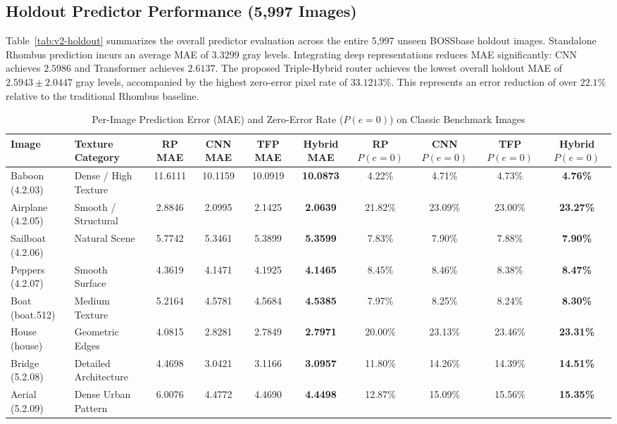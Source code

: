 \documentclass[conference]{IEEEtran}
\begin{document}
\subsection{Holdout Predictor Performance (5,997 Images)}
Table~\ref{tab:v2-holdout} summarizes the overall predictor evaluation across the entire 5,997 unseen BOSSbase holdout images. Standalone Rhombus prediction incurs an average MAE of $3.3299$ gray levels. Integrating deep representations reduces MAE significantly: CNN achieves $2.5986$ and Transformer achieves $2.6137$. The proposed Triple-Hybrid router achieves the lowest overall holdout MAE of $\mathbf{2.5943}\pm2.0447$ gray levels, accompanied by the highest zero-error pixel rate of $\mathbf{33.1213}\%$. This represents an error reduction of over $\mathbf{22.1\%}$ relative to the traditional Rhombus baseline.

\begin{table}[!t]
\centering
\caption{Per-Image Prediction Error (MAE) and Zero-Error Rate ($P(e=0)$) on Classic Benchmark Images}
\label{tab:per-image}
\small
\setlength{\tabcolsep}{7pt}
\begin{tabular*}{\textwidth}{@{\extracolsep{\fill}}llcccccccc@{}}
\toprule
\textbf{Image} & \textbf{Texture Category} & \textbf{RP MAE} & \textbf{CNN MAE} & \textbf{TFP MAE} & \textbf{Hybrid MAE} & \textbf{RP $P(e=0)$} & \textbf{CNN $P(e=0)$} & \textbf{TFP $P(e=0)$} & \textbf{Hybrid $P(e=0)$} \\
\midrule
Baboon (4.2.03)   & Dense / High Texture    & 11.6111 & 10.1159 & 10.0919 & \textbf{10.0873} & 4.22\%  & 4.71\%  & 4.73\%  & \textbf{4.76\%} \\
Airplane (4.2.05) & Smooth / Structural     &  2.8846 &  2.0995 &  2.1425 & \textbf{2.0639}  & 21.82\% & 23.09\% & 23.00\% & \textbf{23.27\%} \\
Sailboat (4.2.06) & Natural Scene           &  5.7742 &  5.3461 &  5.3899 & \textbf{5.3599}  & 7.83\%  & 7.90\%  & 7.88\%  & \textbf{7.90\%} \\
Peppers (4.2.07)  & Smooth Surface          &  4.3619 &  4.1471 &  4.1925 & \textbf{4.1465}  & 8.45\%  & 8.46\%  & 8.38\%  & \textbf{8.47\%} \\
Boat (boat.512)   & Medium Texture          &  5.2164 &  4.5781 &  4.5684 & \textbf{4.5385}  & 7.97\%  & 8.25\%  & 8.24\%  & \textbf{8.30\%} \\
House (house)     & Geometric Edges         &  4.0815 &  2.8281 &  2.7849 & \textbf{2.7971}  & 20.00\% & 23.13\% & 23.46\% & \textbf{23.31\%} \\
Bridge (5.2.08)   & Detailed Architecture   &  4.4698 &  3.0421 &  3.1166 & \textbf{3.0957}  & 11.80\% & 14.26\% & 14.39\% & \textbf{14.51\%} \\
Aerial (5.2.09)   & Dense Urban Pattern     &  6.0076 &  4.4772 &  4.4690 & \textbf{4.4498}  & 12.87\% & 15.09\% & 15.56\% & \textbf{15.35\%} \\
\bottomrule
\end{tabular*}
\end{table}
\end{document}
